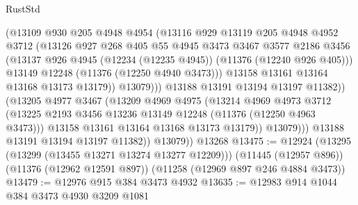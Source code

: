 \begin{lexlean}{RustStd}
\begin{coremodule}
{\begin{coremodule}
{{{{{{{{{{{{{{{{{{{{{{{{{{{{{{{{{{{{{{{{{{{{{{{{{{{{{{{{{{{{{{{{{{{{{{{{{{{{{{{{{{{{{                          (@13109
                            @930
                            @205
                            @4948
                            @4954
                            (@13116
                              @929
                              @13119
                              @205
                              @4948
                              @4952
                              @3712
                              (@13126
                                @927
                                @268
                                @405
                                @55
                                @4945
                                @3473
                                @3467
                                @3577
                                @2186
                                @3456
                                (@13137
                                  @926
                                  @4945
                                  (@12234 (@12235 @4945))
                                  (@11376 (@12240 @926 @405)))
                                @13149
                                @12248
                                (@11376 (@12250 @4940 @3473)))
                              @13158
                              @13161
                              @13164
                              @13168
                              @13173
                              @13179))
                          @13079)))
                    @13188
                    @13191
                    @13194
                    @13197
                    @11382))
                (@13205
                  @4977
                  @3467
                  (@13209
                    @4969
                    @4975
                    (@13214
                      @4969
                      @4973
                      @3712
                      (@13225 @2193 @3456 @13236 @13149 @12248 (@11376 (@12250 @4963 @3473)))
                      @13158
                      @13161
                      @13164
                      @13168
                      @13173
                      @13179))
                  @13079)))
            @13188
            @13191
            @13194
            @13197
            @11382))
        @13079))
    @13268
@13475 := @12924
    (@13295 (@13299 (@13455 @13271 @13274 @13277 @12209)))
    (@11445 (@12957 @896))
    (@11376 (@12962 @12591 @897))
    (@11258 (@12969 @897 @246 @4884 @3473))
@13479 := @12976 @915 @384 @3473 @4932
@13635 := @12983
    @914
    @1044
    @384
    @3473
    @4930
    @3209
    @1081
}}}}}}}}}}}}}}}}}}}}}}}}}}}}}}}}}}}}}}}}}}}}}}}}}}}}}}}}}}}}}}}}}}}}}}}}}}}}}}}}}}}}}
\end{coremodule}}
\end{coremodule}
\end{lexlean}
